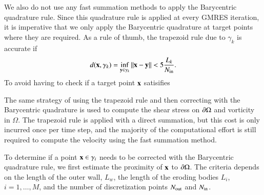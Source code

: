 \documentclass[preprint, 10pt]{elsarticle}
\begin{document}
We also do not use any fast summation methods to apply the Barycentric
quadrature rule.  Since this quadrature rule is applied at every GMRES
iteration, it is imperative that we only apply the Barycentric
quadrature at target points where they are required.  As a rule of
thumb, the trapezoid rule due to $\gamma_k$ is accurate if
\begin{align}
  d({\mathbf{x}},\gamma_k) = \inf_{{\mathbf{y}} \in \gamma_k} \|{\mathbf{x}} - {\mathbf{y}}\| < 
    5 \frac{L_k}{N_{\mathrm{in}}}.
\end{align}
To avoid having to check if a target point ${\mathbf{x}}$ satisifies

The same strategy of using the trapezoid rule and then correcting with
the Barycentric quadrature is used to compute the shear stress on
${\partial}\Omega$ and vorticity in $\Omega$.  The trapezoid rule is applied
with a direct summation, but this cost is only incurred once per time
step, and the majority of the computational effort is still required to
compute the velocity using the fast summation method.

To determine if a point ${\mathbf{x}} \in \gamma_i$ needs to be corrected with
the Barycentric quadrature rule, we first estimate the proximity of
${\mathbf{x}}$ to ${\partial}\Omega$.  The criteria depends on the length of the outer
wall, $L_w$, the length of the eroding bodies $L_i$, $i=1,\ldots,M$, and
the number of discretization points $N_{\mathrm{out}}$ and $N_{\mathrm{in}}$.  
\end{document}
